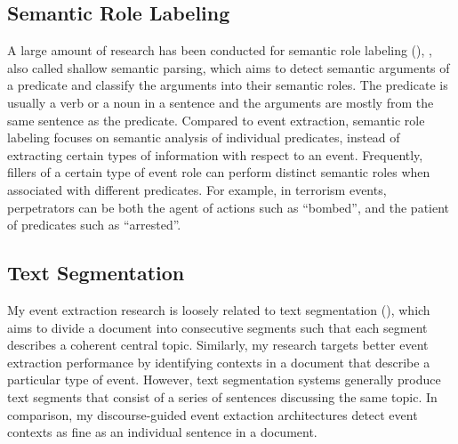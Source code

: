 
\subsection{Semantic Role Labeling}

A large amount of research has been conducted for semantic role labeling 
(\cite{Jurafsky_SRL_2002,Xue_EMNLP_2003,thompson_ECML_2003,punyakanok04,haghighi05,yi05,Carrerras_CoNLL_2005}),
, also called shallow semantic parsing, which aims to
detect semantic arguments of a predicate and
classify the arguments into their 
semantic roles.
The predicate 
is usually a verb or a noun in a sentence
and the arguments are mostly from the same sentence as the predicate.
Compared to event extraction, semantic role labeling focuses on
semantic analysis of individual predicates, instead of
extracting certain types of information with respect to an event.
Frequently, fillers of a certain type of event role 
can perform distinct 
semantic roles
when associated with different predicates. 
For example, in terrorism events, perpetrators can be both the agent of
actions such as ``bombed'', and the patient of predicates such as ``arrested''.




\subsection{Text Segmentation}

My event extraction research is loosely related to
text segmentation (\cite{Hearst97,Beeferman99,Kehagias03,Ji03,Malioutov06,Kazantseva11}), 
which aims to divide a document
into consecutive  segments such that each segment
describes a coherent central topic.
Similarly, my research targets better
event extraction performance by identifying
contexts in a document that describe a
particular type of event.
However, text segmentation systems
generally 
produce text segments that consist of a series of 
sentences discussing the same topic. 
In comparison, my discourse-guided event extaction
architectures detect event contexts
as fine as an individual sentence in a document.



